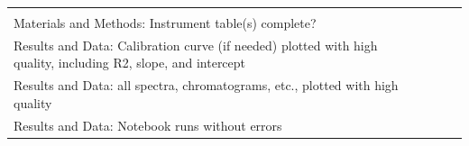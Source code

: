 \documentclass[]{tufte-book}
\begin{document}
\begin{longtable}[]{@{}llll@{}}
\begin{minipage}[t]{0.02\columnwidth}
\strut
\end{minipage}\tabularnewline
\begin{minipage}[t]{0.82\columnwidth}\raggedright
Materials and Methods: Instrument table(s) complete?\strut
\end{minipage} & \begin{minipage}[t]{0.02\columnwidth}\raggedright
\strut
\end{minipage} & \begin{minipage}[t]{0.02\columnwidth}\raggedright
\strut
\end{minipage} & \begin{minipage}[t]{0.02\columnwidth}\raggedright
\strut
\end{minipage}\tabularnewline
\begin{minipage}[t]{0.82\columnwidth}\raggedright
Results and Data: Calibration curve (if needed) plotted with high quality, including R2, slope, and intercept\strut
\end{minipage} & \begin{minipage}[t]{0.02\columnwidth}\raggedright
\strut
\end{minipage} & \begin{minipage}[t]{0.02\columnwidth}\raggedright
\strut
\end{minipage} & \begin{minipage}[t]{0.02\columnwidth}\raggedright
\strut
\end{minipage}\tabularnewline
\begin{minipage}[t]{0.82\columnwidth}\raggedright
Results and Data: all spectra, chromatograms, etc., plotted with high quality\strut
\end{minipage} & \begin{minipage}[t]{0.02\columnwidth}\raggedright
\strut
\end{minipage} & \begin{minipage}[t]{0.02\columnwidth}\raggedright
\strut
\end{minipage} & \begin{minipage}[t]{0.02\columnwidth}\raggedright
\strut
\end{minipage}\tabularnewline
\begin{minipage}[t]{0.82\columnwidth}\raggedright
Results and Data: Notebook runs without errors\strut
\end{minipage} & \begin{minipage}[t]{0.02\columnwidth}\raggedright
\strut
\end{minipage} & \begin{minipage}[t]{0.02\columnwidth}\raggedright

\end{minipage}
\end{longtable}
\end{document}
